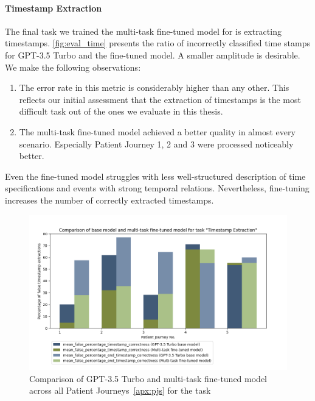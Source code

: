 \paragraph{Timestamp Extraction}
The final task we trained the multi-task fine-tuned model for is extracting timestamps. \autoref{fig:eval_time} presents the ratio of incorrectly classified time stamps for GPT-3.5 Turbo and the fine-tuned model. A smaller amplitude is desirable. We make the following observations:
\begin{enumerate}
    \item The error rate in this metric is considerably higher than any other. This reflects our initial assessment that the extraction of timestamps is the most difficult task out of the ones we evaluate in this thesis.
    \item The multi-task fine-tuned model achieved a better quality in almost every scenario. Especially Patient Journey 1, 2 and 3 were processed noticeably better.
\end{enumerate}
Even the fine-tuned model struggles with less well-structured description of time specifications and events with strong temporal relations. Nevertheless, fine-tuning increases the number of correctly extracted timestamps.
\begin{figure}[ht]
    \centering
    \captionsetup{belowskip=0pt,aboveskip=0pt}
    \includegraphics[width=\textwidth]{bachelor_thesis/images/timestamp_all.png}
    \caption{Comparison of GPT-3.5 Turbo and multi-task fine-tuned model across all Patient Journeys~\ref{apx:pjs} for the task }
    \label{fig:eval_time}
\end{figure}


